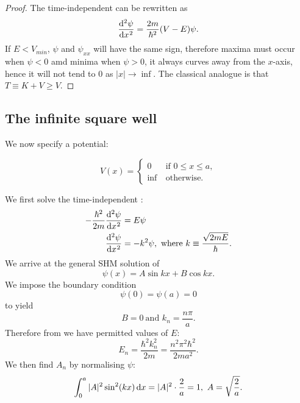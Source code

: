 \begin{proof}
The time-independent \sch can be rewritten as 
\begin{equation}
\diff[2]{\psi}{x}=\frac{2m}{\hbar^2}(V-E)\psi.
\end{equation}
If $E<V_{min}$, $\psi$ and $\psi_{xx}$ will have the same sign, therefore maxima must occur when $\psi<0$ amd minima when $\psi>0$, \ie it always curves away from the $x$-axis, hence it will not tend to $0$ as $|x|\rightarrow\inf$. The classical analogue is that $T\equiv K+V\geq V$.
\end{proof}
\subsection{The infinite square well}
We now specify a potential:
\begin{singlespace}
\begin{equation}
V(x)=
\begin{cases}
0\ &\text{if\ }0\leq x\leq a,\\
\inf\ &\text{otherwise}.
\end{cases}
\end{equation}
\end{singlespace}
We first solve the time-independent \sch:
\begin{equation}
\label{inf_sqr_k}
\begin{aligned}
-\frac{\hbar^2}{2m}\diff[2]{\psi}{x}&=E\psi\\
\diff[2]{\psi}{x}&=-k^2\psi,\ \text{where\ }k\equiv\frac{\sqrt{2mE}}{\hbar}.
\end{aligned}
\end{equation}
We arrive at the general SHM solution of 
\begin{equation}
\psi(x)=A\sin kx+B\cos kx.
\end{equation}
We impose the boundary condition
\begin{equation}
\psi(0)=\psi(a)=0
\end{equation}
to yield
\begin{equation}
B=0\ \text{and }k_n=\frac{n\pi}{a}. 
\end{equation}
Therefore from  we have permitted values of $E$:
\begin{equation}
\label{infsqrwelle}
E_n=\frac{\hbar^2k_n^2}{2m}=\frac{n^2\pi^2\hbar^2}{2ma^2}.
\end{equation}
We then find $A_n$ by normalising $\psi$:
\begin{equation}
\int^a_0|A|^2\sin^2(kx)\dx=|A|^2\cdot\frac{2}{a}=1,\ A=\sqrt{\frac{2}{a}}.
\end{equation}

